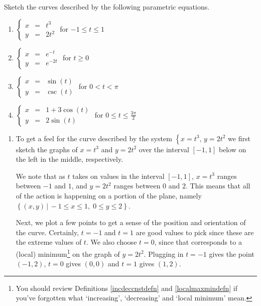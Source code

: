 \documentclass{ximera}
\begin{document}
\begin{example} \label{parametrictorect}  Sketch the curves described by the following parametric equations.  

\begin{enumerate}

\item  $\left\{ \begin{array}{rcl} x & = & t^3 \\ y & = & 2t^2 \end{array} \right.$ for $-1 \leq t \leq 1$
\item  $\left\{ \begin{array}{rcl} x & = & e^{-t} \\ y & = & e^{-2t} \end{array} \right.$ for $t \geq 0$
\item \label{parametric1overx} $\left\{ \begin{array}{rcl} x & = & \sin(t) \\ y & = & \csc(t) \end{array} \right.$ for $0 < t < \pi$
\item  \label{parametricellipse} $\left\{ \begin{array}{rcl} x & = & 1 + 3\cos(t) \\ y & = & 2\sin(t) \end{array} \right.$ for $0 \leq t \leq \frac{3\pi}{2}$
  

\end{enumerate}

\begin{explanation}
    


\begin{enumerate}

\item  To get a feel for the curve described by the system $\left\{ x = t^3, \, y = 2t^2 \right.$ we first sketch the graphs of $x = t^3$ and $y =  2t^2$ over the interval $[-1,1]$ below on the left in the middle, respectively.

We note that as $t$ takes on values in the interval $[-1,1]$, $x = t^3$ ranges between $-1$ and $1$, and $y =  2t^2$ ranges between $0$ and $2$.    This means that all of the action is happening on a portion of the plane, namely $\left\{ (x,y) \, | \, -1 \leq x \leq 1, \; 0 \leq y \leq 2 \right\}$.  

Next, we plot a few points to get a sense of the position and orientation of the curve.  Certainly, $t=-1$ and $t=1$ are good values to pick since these are the extreme values of $t$. 
We also choose $t=0$, since that corresponds to a (local) minimum\footnote{You should review Definitions \ref{incdeccnstdefn} and \ref{localmaxmindefn}  if you've forgotten what `increasing', `decreasing' and `local minimum' mean.} on the graph of $y = 2t^2$.   Plugging in $t = -1$ gives the point $(-1,2)$, $t = 0$ gives $(0,0)$ and $t=1$ gives $(1,2)$.


\end{enumerate}
\end{explanation}
\end{example}
\end{document}
